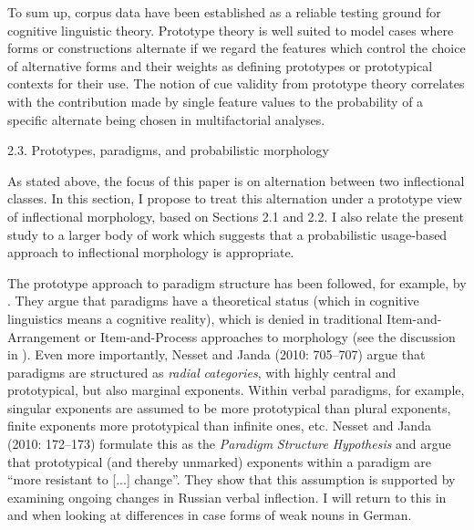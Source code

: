 \begin{styleMoutonText}
To sum up, corpus data have been established as a reliable testing ground for cognitive linguistic theory. Prototype theory is well suited to model cases where forms or constructions alternate if we regard the features which control the choice of alternative forms and their weights as defining prototypes or prototypical contexts for their use. The notion of cue validity from prototype theory correlates with the contribution made by single feature values to the probability of a specific alternate being chosen in multifactorial analyses.
\end{styleMoutonText}

\begin{styleMoutonHeadingii}
2.3. Prototypes, paradigms, and probabilistic morphology
\end{styleMoutonHeadingii}

\begin{styleMoutonText}
As stated above, the focus of this paper is on alternation between two inflectional classes. In this section, I propose to treat this alternation under a prototype view of inflectional morphology, based on Sections 2.1 and 2.2. I also relate the present study to a larger body of work which suggests that a probabilistic usage-based approach to inflectional morphology is appropriate.
\end{styleMoutonText}

\begin{styleMoutonText}
The prototype approach to paradigm structure has been followed, for example, by \citet{NessetJanda2010}. They argue that paradigms have a theoretical status (which in cognitive linguistics means a cognitive reality), which is denied in traditional Item-and-Arrangement or Item-and-Process approaches to morphology (see the discussion in \citealt{Bybee1985}). Even more importantly, Nesset and Janda (2010: 705–707) argue that paradigms are structured as \textit{radial} \textit{categories}, with highly central and prototypical, but also marginal exponents. Within verbal paradigms, for example, singular exponents are assumed to be more prototypical than plural exponents, finite exponents more prototypical than infinite ones, etc. Nesset and Janda (2010: 172–173) formulate this as the \textit{Paradigm} \textit{Structure} \textit{Hypothesis} and argue that prototypical (and thereby unmarked) exponents within a paradigm are “more resistant to [...] change”. They show that this assumption is supported by examining ongoing changes in Russian verbal inflection. I will return to this in  and  when looking at differences in case forms of weak nouns in German.
\end{styleMoutonText}

